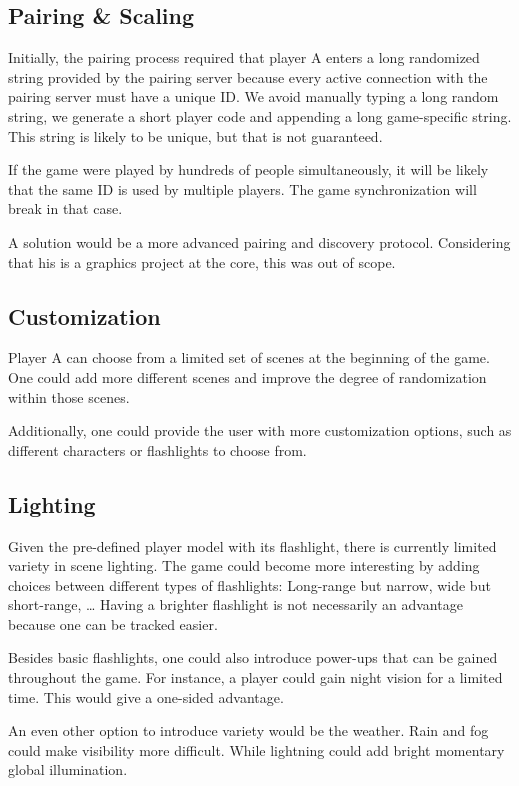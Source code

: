 \documentclass[11pt]{article}
\begin{document}
\subsection{Pairing \& Scaling}
\par Initially, the pairing process required that player A enters a long randomized string provided by the pairing server because every active connection with the pairing server must have a unique ID. We avoid manually typing a long random string, we generate a short player code and appending a long game-specific string. This string is likely to be unique, but that is not guaranteed.
\par If the game were played by hundreds of people simultaneously, it will be likely that the same ID is used by multiple players. The game synchronization will break in that case.
\par A solution would be a more advanced pairing and discovery protocol. Considering that his is a graphics project at the core, this was out of scope.

\subsection{Customization}
\par Player A can choose from a limited set of scenes at the beginning of the game. One could add more different scenes and improve the degree of randomization within those scenes.
\par Additionally, one could provide the user with more customization options, such as different characters or flashlights to choose from.

\subsection{Lighting}
\par Given the pre-defined player model with its flashlight, there is currently limited variety in scene lighting. The game could become more interesting by adding choices between different types of flashlights: Long-range but narrow, wide but short-range, … Having a brighter flashlight is not necessarily an advantage because one can be tracked easier.
\par Besides basic flashlights, one could also introduce power-ups that can be gained throughout the game. For instance, a player could gain night vision for a limited time. This would give a one-sided advantage.
\par An even other option to introduce variety would be the weather. Rain and fog could make visibility more difficult. While lightning could add bright momentary global illumination.
\end{document}

